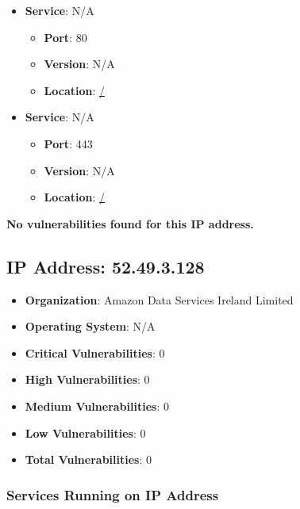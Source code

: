 \documentclass{article}
\begin{document}
\begin{itemize}
    
        \item \textbf{Service}: N/A
        \begin{itemize}
            \item \textbf{Port}: 80
            \item \textbf{Version}:  N/A 
            \item \textbf{Location}: \href{ / }{ / }
        \end{itemize}
    
        \item \textbf{Service}: N/A
        \begin{itemize}
            \item \textbf{Port}: 443
            \item \textbf{Version}:  N/A 
            \item \textbf{Location}: \href{ / }{ / }
        \end{itemize}
    
\end{itemize}


\textbf{No vulnerabilities found for this IP address.}




\clearpage



\subsection{IP Address: 52.49.3.128}

\begin{itemize}
    \item \textbf{Organization}: Amazon Data Services Ireland Limited
    \item \textbf{Operating System}:  N/A 
    \item \textbf{Critical Vulnerabilities}: 0
    \item \textbf{High Vulnerabilities}: 0
    \item \textbf{Medium Vulnerabilities}: 0
    \item \textbf{Low Vulnerabilities}: 0
    \item \textbf{Total Vulnerabilities}: 0
\end{itemize}

\subsubsection*{Services Running on IP Address}
\end{document}
